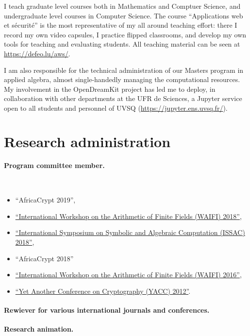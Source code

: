 \documentclass{book}
\begin{document}
I teach graduate level courses both in Mathematics and Comptuer
Science, and undergraduate level courses in Computer Science.  The
course ``Applications web et sécurité'' is the most representative of
my all around teaching effort: there I record my own video capsules, I
practice flipped classrooms, and develop my own tools for teaching and
evaluating students.  All teaching material can be seen at
\url{https://defeo.lu/aws/}.

I am also responsible for the technical administration of our Masters
program in applied algebra, almost single-handedly managing the
computational resources. My involvement in the OpenDreamKit project
has led me to deploy, in collaboration with other departments at the
UFR de Sciences, a Jupyter service open to all students and personnel
of UVSQ (\url{https://jupyter.ens.uvsq.fr/}).

\section*{Research administration}

\paragraph{Program committee member.}\

\begin{itemize}
\item
  ``AfricaCrypt 2019'',
\item
  \href{http://waifi.org/}{``International Workshop on the Arithmetic
    of Finite Fields (WAIFI) 2018''},
\item
  \href{http://issac-conference.org/2018/}{``International Symposium
    on Symbolic and Algebraic Computation (ISSAC) 2018''},
\item
  ``AfricaCrypt 2018''
\item
  \href{http://waifi.org/}{``International Workshop on the Arithmetic
    of Finite Fields (WAIFI) 2016''},
\item
  \href{http://yacc.univ-tln.fr/}{``Yet Another Conference on
    Cryptography (YACC) 2012''}.
\end{itemize}

\paragraph{Rewiever for various international journals and conferences.}

\paragraph{Research animation.}\
\end{document}
